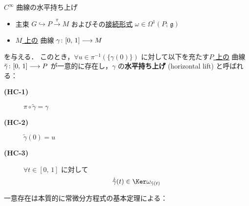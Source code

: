 \documentclass[geometry_main]{subfiles}
\begin{document}
\begin{mydef}[label=def:horizontal-lift-curve]{$C^\infty$ 曲線の水平持ち上げ}
    \begin{itemize}
        \item 主束 $G \hookrightarrow P \xrightarrow{\pi} M$ およびその\hyperref[def:connection]{接続形式} $\omega \in \Omega^1(P;\, \mathfrak{g})$
        \item \underline{$M$ 上の} \cinfty 曲線 $\gamma \colon [0,\, 1] \longrightarrow M$
    \end{itemize}
    を与える．
    このとき，$\forall u \in \pi^{-1}(\{\gamma(0)\})$ に対して以下を充たす\underline{$P$ 上の} \cinfty 曲線 $\tilde{\gamma} \colon [0,\, 1] \longrightarrow P$ が一意的に存在し，$\gamma$ の\textbf{水平持ち上げ} (horizontal lift) と呼ばれる：
    \begin{description}
        \item[\textbf{(HC-1)}] $\pi \circ \tilde{\gamma} = \gamma$
        \item[\textbf{(HC-2)}] $\tilde{\gamma}(0) = u$
        \item[\textbf{(HC-3)}] $\forall t \in [0,\, 1]$ に対して
        \begin{align}
            \dot{\tilde{\gamma}}(t) \in \Ker \omega_{\tilde{\gamma}(t)}
        \end{align}
    \end{description}
\end{mydef}


一意存在は本質的に常微分方程式の基本定理による：
\end{document}
